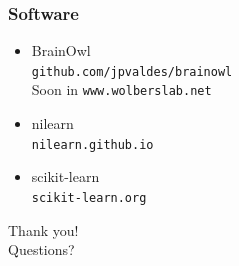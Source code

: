 \documentclass[11pt]{beamer}
\begin{document}
\begin{frame}
  \frametitle{Software}
  \begin{itemize}
      \item BrainOwl \\ \texttt{github.com/jpvaldes/brainowl}
          \\ Soon in \texttt{www.wolberslab.net}
      \item nilearn \\ \texttt{nilearn.github.io}
      \item scikit-learn \\ \texttt{scikit-learn.org}
  \end{itemize}
\end{frame}
\begin{frame}[standout]
    Thank you! \\
    Questions?
\end{frame}
\end{document}
